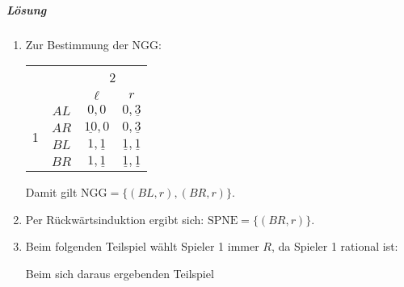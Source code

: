 \subparagraph{Lösung}%

\begin{enumerate}
  \item Zur Bestimmung der NGG:
    \begin{center}
      \begin{tabular}{cccc}
        & & \multicolumn{2}{c}{2}\\
        & & $\ell$ & $r$\\
        \multirow{4}{*}{1}
        & $AL$ & $0,0$ & $0,\underline{3}$\\
        & $AR$ & $\underline{10},0$ & $0,\underline{3}$\\
        & $BL$ & $1,\underline{1}$ & $\underline{1},\underline{1}$\\
        & $BR$ & $1,\underline{1}$ & $\underline{1},\underline{1}$
      \end{tabular}
    \end{center}
    Damit gilt $\text{NGG} = \{(BL, r), (BR,r)\}$.

  \item Per Rückwärtsinduktion ergibt sich: $\text{SPNE} = \{(BR,r)\}$.

  \item Beim folgenden Teilspiel wählt Spieler 1 immer $R$, da Spieler 1 rational ist:
    \begin{center}
    \end{center}
    Beim sich daraus ergebenden Teilspiel
    \begin{center}
\end{center}
\end{enumerate}
